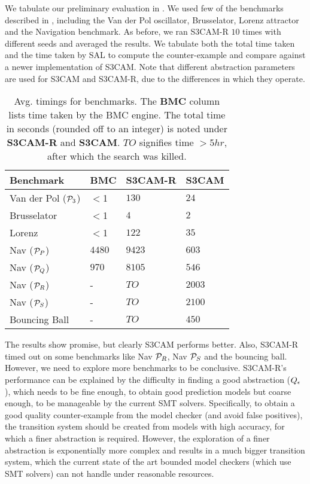 We tabulate our preliminary evaluation in . We used
few of the benchmarks described in , including the Van
der Pol oscillator, Brusselator, Lorenz attractor and the Navigation
benchmark. As before, we ran S3CAM-R $10$ times with different seeds
and averaged the results. We tabulate both the total time taken and
the time taken by SAL to compute the counter-example and compare
against a newer implementation of S3CAM. Note that different
abstraction parameters are used for S3CAM and S3CAM-R, due to the
differences in which they operate.

\begin{table*}[!htbp]
\centering
\caption{Avg. timings for benchmarks. The \textbf{BMC} column lists
time taken by the BMC engine. The total time in seconds (rounded off
to an integer) is noted under \textbf{S3CAM-R} and \textbf{S3CAM}.
$TO$ signifies time $>5hr$, after which the search was killed.}
\label{tab:res-rel}
\begin{tabular}{@{}llll@{}}
\toprule
Benchmark & BMC & S3CAM-R & S3CAM\\
\midrule
Van der Pol ($\mathcal{P}_3$)   &$<$1 & $130$ & $24$\\
Brusselator               &$<$1  & $4$    & $2$\\
Lorenz                    &$<$1 & $122$  & $35$\\
Nav ($\mathcal{P}_P$)           &$4480$ &$9423$   &$603$ \\
Nav ($\mathcal{P}_Q$)           &$970$  &$8105$   &$546$ \\
Nav ($\mathcal{P}_R$)           &-  &$TO$   & $2003$\\
Nav ($\mathcal{P}_S$)           &-  &$TO$   & $2100$\\
Bouncing Ball             &-  &$TO$   & $450$\\

\bottomrule
\end{tabular}
\end{table*}


The results show promise, but clearly S3CAM performs better. Also,
S3CAM-R timed out on some benchmarks like Nav $\mathcal{P}_R$, Nav $\mathcal{P}_S$
and the bouncing ball. However, we need to explore more benchmarks to
be conclusive. S3CAM-R's performance can be explained by the
difficulty in finding a good abstraction ($Q_\epsilon$), which
needs to be fine enough, to obtain good prediction models but coarse
enough, to be manageable by the current SMT solvers. Specifically, to
obtain a good quality counter-example from the model checker (and
avoid false positives), the transition system should be created from
models with high accuracy, for which a finer abstraction is required.
However, the exploration of a finer abstraction is exponentially more
complex and results in a much bigger transition system, which the
current state of the art bounded model checkers (which use SMT
solvers) can not handle under reasonable resources.

